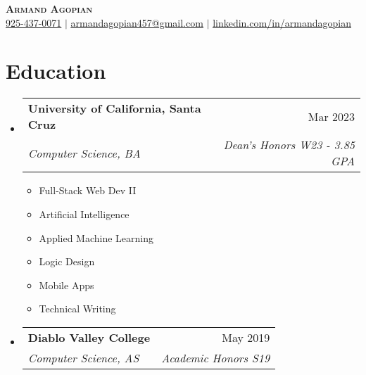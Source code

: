 \documentclass[letterpaper,11pt]{article}
\makeatletter
\newcommand{\resumeSubheading}[4]{
  \vspace{-2pt}\item
    \begin{tabular*}{0.97\textwidth}[t]{l@{\extracolsep{\fill}}r}
      \textbf{#1} & #2 \\
      \textit{\small#3} & \textit{\small #4} \\
    \end{tabular*}\vspace{-7pt}
}
\newcommand{\resumeSubHeadingListStart}{\begin{itemize}[leftmargin=0.15in, label={}]}
\newcommand{\resumeSubHeadingListEnd}{\end{itemize}}
\makeatother
\begin{document}

\begin{center}
    \textbf{\Huge \scshape Armand Agopian} \\ \vspace{1pt}
    \small \href{tel:+19254370071}{925-437-0071} $|$ 
    \href{mailto:armandagopian457@gmail.com}{\underline{armandagopian457@gmail.com}} $|$ 
    \href{https://linkedin.com/in/armandagopian}{\underline{linkedin.com/in/armandagopian}}
\end{center}

\vspace{-0.8cm}
\section{Education}
  \resumeSubHeadingListStart
    \resumeSubheading
      {University of California, Santa Cruz}{Mar 2023}
      {Computer Science, BA}{Dean's Honors W23 - 3.85 GPA}
      \begin{multicols}{3}
        \begin{itemize}
            \item Full-Stack Web Dev II
            \item Artificial Intelligence
            \item Applied Machine Learning
            \item Logic Design
            \item Mobile Apps
            \item Technical Writing
        \end{itemize}
      \end{multicols}
      \vspace{-1\baselineskip}
    \resumeSubheading
      {Diablo Valley College}{May 2019}
      {Computer Science, AS}{Academic Honors S19}
  \resumeSubHeadingListEnd
      
\end{document}
